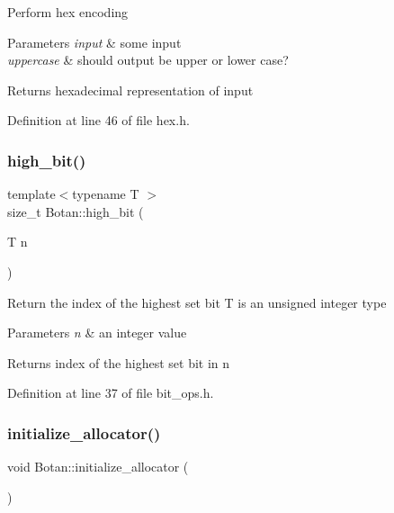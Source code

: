 Perform hex encoding 
\begin{DoxyParams}{Parameters}
{\em input} & some input \\
\hline
{\em uppercase} & should output be upper or lower case? \\
\hline
\end{DoxyParams}
\begin{DoxyReturn}{Returns}
hexadecimal representation of input 
\end{DoxyReturn}


Definition at line 46 of file hex.\+h.

\mbox{\label{namespace_botan_ad6c09360d3936ba7077b2d8b14d6cbaa}} 
\subsubsection{\texorpdfstring{high\+\_\+bit()}{high\_bit()}}
{\footnotesize\ttfamily template$<$typename T $>$ \\
size\+\_\+t Botan\+::high\+\_\+bit (\begin{DoxyParamCaption}\item[{T}]{n }\end{DoxyParamCaption})\hspace{0.3cm}{\ttfamily [inline]}}

Return the index of the highest set bit T is an unsigned integer type 
\begin{DoxyParams}{Parameters}
{\em n} & an integer value \\
\hline
\end{DoxyParams}
\begin{DoxyReturn}{Returns}
index of the highest set bit in n 
\end{DoxyReturn}


Definition at line 37 of file bit\+\_\+ops.\+h.

\mbox{\label{namespace_botan_a5c191055a4f5a2dba6bfde0e8056eaab}} 
\subsubsection{\texorpdfstring{initialize\+\_\+allocator()}{initialize\_allocator()}}
{\footnotesize\ttfamily void Botan\+::initialize\+\_\+allocator (\begin{DoxyParamCaption}{ }\end{DoxyParamCaption})}

